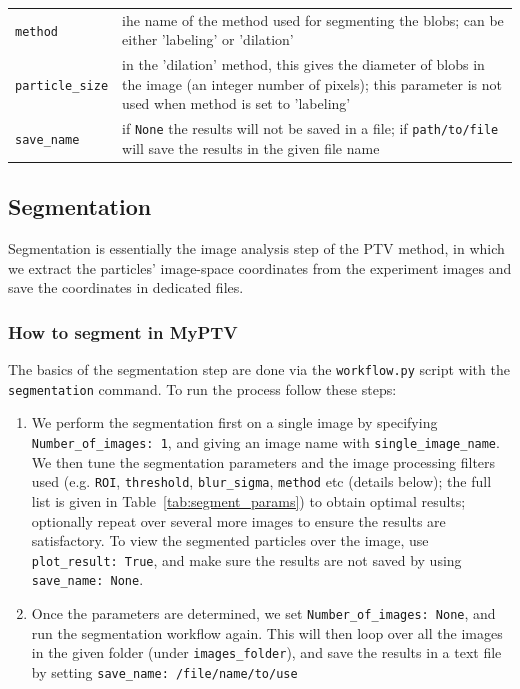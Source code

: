 \documentclass[10pt,a4paper]{article}
\begin{document}
\begin{table}[!ht]
\begin{tabular}{l m{10cm}}
		\texttt{method} & ihe name of the method used for segmenting the blobs; can be either 'labeling' or 'dilation' \\
		
		\texttt{particle\_size} & in the 'dilation' method, this gives the diameter of blobs in the image (an integer number of pixels); this parameter is not used when method is set to 'labeling' \\
		
		\texttt{save\_name} & if \texttt{None} the results will not be saved in a file; if \texttt{path/to/file} will save the results in the given file name \\
		
		\hline
	\end{tabular}
\end{table}




\subsection{Segmentation}\label{sec:workflow_segment}


Segmentation is essentially the image analysis step of the PTV method, in which we extract the particles' image-space coordinates from the experiment images and save the coordinates in dedicated files. 


\subsubsection{How to segment in MyPTV}

The basics of the segmentation step are done via the \texttt{workflow.py} script with the \texttt{segmentation} command. To run the process follow these steps:

\begin{enumerate}
	\item We perform the segmentation first on a single image by specifying \texttt{Number\_of\_images: 1}, and giving an image name with \texttt{single\_image\_name}. We then tune the segmentation parameters and the image processing filters used (e.g. \texttt{ROI}, \texttt{threshold}, \texttt{blur\_sigma}, \texttt{method} etc (details below); the full list is given in Table~\ref{tab:segment_params}) to obtain optimal results; optionally repeat over several more images to ensure the results are satisfactory. To view the segmented particles over the image, use \texttt{plot\_result: True}, and make sure the results are not saved by using \texttt{save\_name: None}. 
	
	\item Once the parameters are determined, we set \texttt{Number\_of\_images: None}, and run the segmentation workflow again. This will then loop over all the images in the given folder (under \texttt{images\_folder}), and save the results in a text file by setting \texttt{save\_name: /file/name/to/use}
\end{enumerate}
\end{document}
